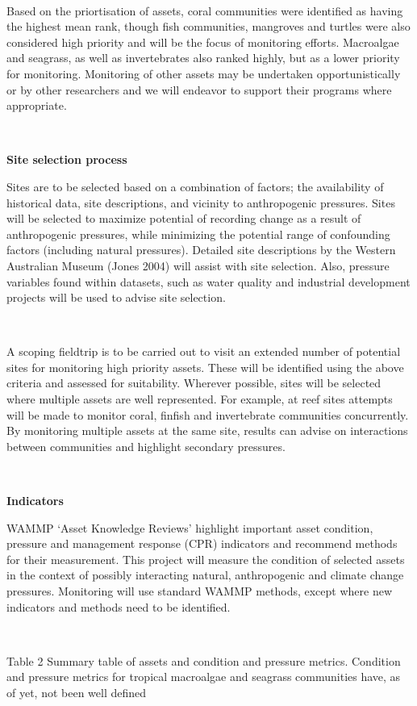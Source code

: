 \documentclass[version=last,
    paper=a4,                               %
    10pt,                                   %
    dvipsnames,
    oneside,                              %
    headings=openany,                       %
    open=any,
    BCOR=7mm,                               %
    DIV=15,     %
]{scrbook}
\begin{document}
~

Based on the priortisation of assets, coral communities were identified
as having the highest mean rank, though fish communities, mangroves and
turtles were also considered high priority and will be the focus of
monitoring efforts. Macroalgae and seagrass, as well as invertebrates
also ranked highly, but as a lower priority for monitoring. Monitoring
of other assets may be undertaken opportunistically or by other
researchers and we will endeavor to support their programs where
appropriate.

~

\textbf{Site selection process}

Sites are to be selected based on a combination of factors; the
availability of historical data, site descriptions, and vicinity to
anthropogenic pressures. Sites will be selected to maximize potential of
recording change as a result of anthropogenic pressures, while
minimizing the potential range of confounding factors (including natural
pressures). Detailed site descriptions by the Western Australian Museum
(Jones 2004) will assist with site selection. Also, pressure variables
found within datasets, such as water quality and industrial development
projects will be used to advise site selection.

~

A scoping fieldtrip is to be carried out to visit an extended number of
potential sites for monitoring high priority assets. These will be
identified using the above criteria and assessed for suitability.
Wherever possible, sites will be selected where multiple assets are well
represented. For example, at reef sites attempts will be made to monitor
coral, finfish and invertebrate communities concurrently. By monitoring
multiple assets at the same site, results can advise on interactions
between communities and highlight secondary pressures.

~

\textbf{Indicators}

WAMMP `Asset Knowledge Reviews' highlight important asset condition,
pressure and management response (CPR) indicators and recommend methods
for their measurement. This project will measure the condition of
selected assets in the context of possibly interacting natural,
anthropogenic and climate change pressures. Monitoring will use standard
WAMMP methods, except where new indicators and methods need to be
identified.

~

Table 2 Summary table of assets and condition and pressure metrics.
Condition and pressure metrics for tropical macroalgae and seagrass
communities have, as of yet, not been well defined
\end{document}
